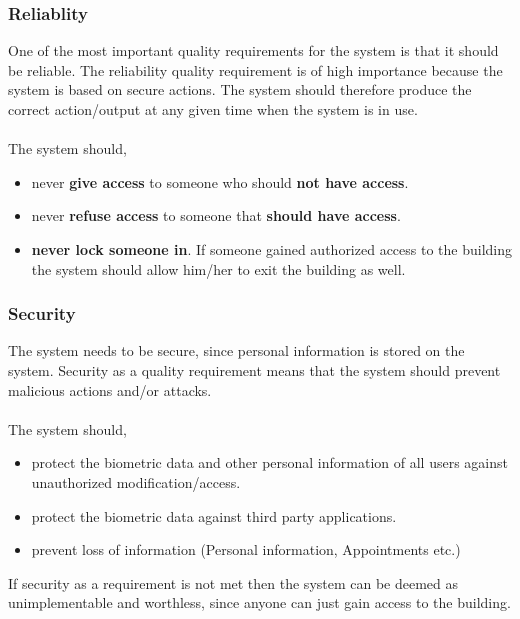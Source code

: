 \subsubsection{Reliablity}
One of the most important quality requirements for the system is that it should be reliable. The reliability quality requirement is of high importance because the system is based on secure actions.
The system should therefore produce the correct action/output at any given time when the system is in use.\\
\\The system should,
\begin{itemize}
	\item  never \textbf{give access} to someone who should \textbf{not have access}.
	\item  never \textbf{refuse access} to someone that\textbf{ should have access}. 
	\item  \textbf{never lock someone in}. If someone gained authorized access to the building the system should allow him/her to exit the building as well.

\end{itemize}

\subsubsection{Security}
The system needs to be secure, since personal information is stored on the system. Security as a quality requirement means that the system should prevent malicious actions and/or attacks.\\
\\The system should,
\begin{itemize}
	\item  protect the biometric data and other personal information of all users against unauthorized modification/access.
	\item  protect the biometric data against third party applications.
	\item  prevent loss of information (Personal information, Appointments etc.)
\end{itemize}

If security as a requirement is not met then the system can be deemed as unimplementable and worthless, since anyone can just gain access to the building.

